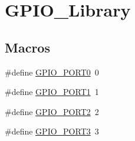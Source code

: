 \hypertarget{group___g_p_i_o___library}{}\section{G\+P\+I\+O\+\_\+\+Library}
\label{group___g_p_i_o___library}
\subsection*{Macros}
\begin{DoxyCompactItemize}
\item 
\#define \hyperlink{group___g_p_i_o___library_gad1230a811f6bc942c555ee29f8e94492}{G\+P\+I\+O\+\_\+\+P\+O\+R\+T0}~0
\item 
\#define \hyperlink{group___g_p_i_o___library_ga4135ea22c25d40b07b0a6efd9bd04afc}{G\+P\+I\+O\+\_\+\+P\+O\+R\+T1}~1
\item 
\#define \hyperlink{group___g_p_i_o___library_gafd8ac6f9c2840f934bd64c5d1afbee1b}{G\+P\+I\+O\+\_\+\+P\+O\+R\+T2}~2
\item 
\#define \hyperlink{group___g_p_i_o___library_ga3a80ea3e46215d518b8488713acc1d64}{G\+P\+I\+O\+\_\+\+P\+O\+R\+T3}~3
\end{DoxyCompactItemize}
